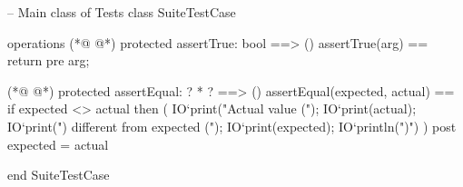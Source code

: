 \begin{vdmpp}[breaklines=true]
-- Main class of Tests
class SuiteTestCase

operations
(*@
\label{assertTrue:5}
@*)
  protected assertTrue: bool ==> ()
  assertTrue(arg) ==
    return
  pre arg;
 
(*@
\label{assertEqual:10}
@*)
  protected assertEqual: ? * ? ==> ()
  assertEqual(expected, actual) ==
    if expected <> actual then (
      IO`print("Actual value (");
      IO`print(actual);
      IO`print(") different from expected (");
      IO`print(expected);
      IO`println(")\n")
    )
  post expected = actual

end SuiteTestCase
\end{vdmpp}
